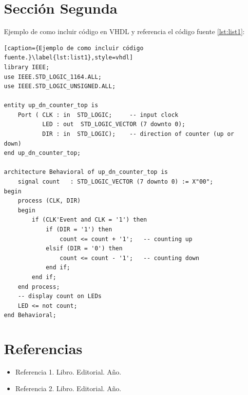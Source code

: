 \documentclass[onecolumn]{article}
\begin{document}
\section{Sección Segunda}

Ejemplo de como incluir código en VHDL y referencia el código fuente \ref{lst:list1}:

\begin{lstlisting}[caption={Ejemplo de como incluir código fuente.}\label{lst:list1},style=vhdl] 
library IEEE;
use IEEE.STD_LOGIC_1164.ALL;
use IEEE.STD_LOGIC_UNSIGNED.ALL;

entity up_dn_counter_top is
    Port ( CLK : in  STD_LOGIC;     -- input clock
           LED : out  STD_LOGIC_VECTOR (7 downto 0);
           DIR : in  STD_LOGIC);    -- direction of counter (up or down)
end up_dn_counter_top;

architecture Behavioral of up_dn_counter_top is
    signal count   : STD_LOGIC_VECTOR (7 downto 0) := X"00";
begin    
    process (CLK, DIR)
    begin
        if (CLK'Event and CLK = '1') then
            if (DIR = '1') then
                count <= count + '1';   -- counting up
            elsif (DIR = '0') then
                count <= count - '1';   -- counting down
            end if;
        end if;
    end process;
    -- display count on LEDs
    LED <= not count;
end Behavioral;

\end{lstlisting}


\section*{Referencias}

\begin{itemize}
	\item Referencia 1. Libro. Editorial. Año.
	\item Referencia 2. Libro. Editorial. Año.
\end{itemize}
\end{document}
